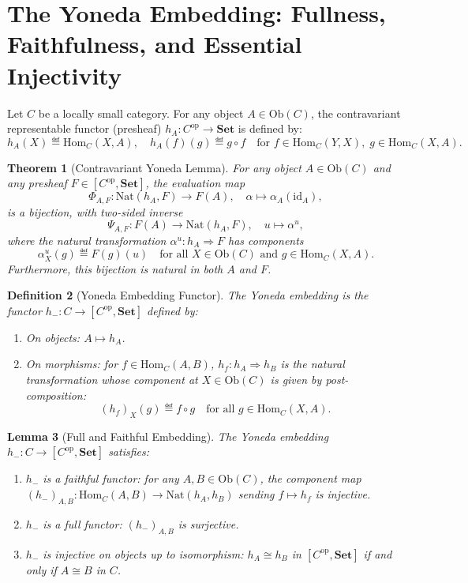 \documentclass{article}
\newtheorem{theorem}{Theorem}
\newtheorem{lemma}[theorem]{Lemma}
\newtheorem{definition}[theorem]{Definition}
\newcommand{\Set}{\mathbf{Set}}
\newcommand{\Hom}{\mathrm{Hom}}
\newcommand{\Nat}{\mathrm{Nat}}
\newcommand{\op}{\mathrm{op}}
\newcommand{\Ob}{\mathrm{Ob}}
\newcommand{\id}{\mathrm{id}}
\begin{document}
\section*{The Yoneda Embedding: Fullness, Faithfulness, and Essential Injectivity}

Let $C$ be a locally small category. For any object $A \in \Ob(C)$, the contravariant representable functor (presheaf) $h_A : C^\op \to \Set$ is defined by:
\[
h_A(X) \eqdef \Hom_C(X, A), \quad h_A(f)(g) \eqdef g \circ f \quad \text{for } f \in \Hom_C(Y, X), \; g \in \Hom_C(X, A).
\]

\begin{theorem}[Contravariant Yoneda Lemma]
For any object $A \in \Ob(C)$ and any presheaf $F \in [C^\op, \Set]$, the evaluation map
\[
\Phi_{A, F} : \Nat(h_A, F) \longrightarrow F(A), \quad \alpha \longmapsto \alpha_A(\id_A),
\]
is a bijection, with two-sided inverse
\[
\Psi_{A, F} : F(A) \longrightarrow \Nat(h_A, F), \quad u \longmapsto \alpha^u,
\]
where the natural transformation $\alpha^u : h_A \Rightarrow F$ has components
\[
\alpha^u_X(g) \eqdef F(g)(u) \quad \text{for all } X \in \Ob(C) \text{ and } g \in \Hom_C(X, A).
\]
Furthermore, this bijection is natural in both $A$ and $F$.
\end{theorem}

\begin{definition}[Yoneda Embedding Functor]
The \emph{Yoneda embedding} is the functor $h_- : C \to [C^\op, \Set]$ defined by:
\begin{enumerate}
    \item On objects: $A \longmapsto h_A$.
    \item On morphisms: for $f \in \Hom_C(A, B)$, $h_f : h_A \Rightarrow h_B$ is the natural transformation whose component at $X \in \Ob(C)$ is given by post-composition:
    \[
    (h_f)_X(g) \eqdef f \circ g \quad \text{for all } g \in \Hom_C(X, A).
    \]
\end{enumerate}
\end{definition}

\begin{lemma}[Full and Faithful Embedding]
The Yoneda embedding $h_- : C \to [C^\op, \Set]$ satisfies:
\begin{enumerate}
    \item $h_-$ is a faithful functor: for any $A, B \in \Ob(C)$, the component map $(h_-)_{A, B} : \Hom_C(A, B) \to \Nat(h_A, h_B)$ sending $f \mapsto h_f$ is injective.
    \item $h_-$ is a full functor: $(h_-)_{A, B}$ is surjective.
    \item $h_-$ is injective on objects up to isomorphism: $h_A \cong h_B$ in $[C^\op, \Set]$ if and only if $A \cong B$ in $C$.
\end{enumerate}
\end{lemma}
\end{document}
